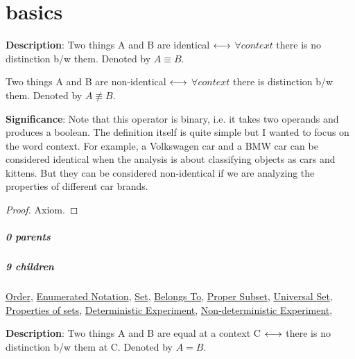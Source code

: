 \documentclass[../main.tex]{subfiles}
\begin{document}
\chapter{basics}


\begin{statement}
\label{statement:Identity}\hspace*{0pt}\par
\end{statement}
\textbf{Description}:
Two things A and B are identical $ \longleftrightarrow $ $ \forall context $ there is no distinction b/w them. Denoted by $ A \equiv B $.

Two things A and B are non-identical $ \longleftrightarrow $ $ \forall context $ there is distinction b/w them. Denoted by $ A \not\equiv B $.
\par
{\color{magenta} \textbf{Significance}:
Note that this operator is binary, i.e. it takes two operands and produces a boolean.
The definition itself is quite simple but I wanted to focus on the word context.
For example, a Volkswagen car and a BMW car can be considered identical when the analysis is about classifying objects as cars and kittens.
But they can be considered non-identical if we are analyzing the properties of different car brands.
\par}
\begin{proof}Axiom.\end{proof}\par
\paragraph{0 parents} 
\paragraph{9 children} \hyperref[statement:Order]{Order}, \hyperref[statement:Enumerated Notation]{Enumerated Notation}, \hyperref[statement:Set]{Set}, \hyperref[statement:Belongs To]{Belongs To}, \hyperref[statement:Proper Subset]{Proper Subset}, \hyperref[statement:Universal Set]{Universal Set}, \hyperref[statement:Properties of sets]{Properties of sets}, \hyperref[statement:Deterministic Experiment]{Deterministic Experiment}, \hyperref[statement:Non-deterministic Experiment]{Non-deterministic Experiment}, 



\begin{statement}
\label{statement:Equality}\hspace*{0pt}\par
\end{statement}
\textbf{Description}:
Two things A and B are equal at a context C $ \longleftrightarrow $ there is no distinction b/w them at C. Denoted by $ A = B $.
\end{document}
